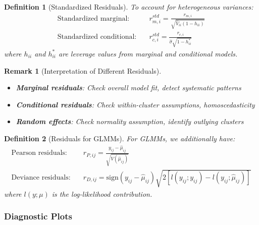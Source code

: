 \documentclass{article}
\newtheorem{definition}{Definition}
\newtheorem{remark}{Remark}
\begin{document}
\begin{definition}[Standardized Residuals]
To account for heterogeneous variances:
\begin{align}
\text{Standardized marginal}: & \quad r_{m,i}^{std} = \frac{r_{m,i}}{\sqrt{\hat{V}_{ii}(1-h_{ii})}} \\
\text{Standardized conditional}: & \quad r_{c,i}^{std} = \frac{r_{c,i}}{\hat{\sigma}\sqrt{1-h_{ii}^*}}
\end{align}
where $h_{ii}$ and $h_{ii}^*$ are leverage values from marginal and conditional models.
\end{definition}

\begin{remark}[Interpretation of Different Residuals]
\begin{itemize}
    \item \textbf{Marginal residuals}: Check overall model fit, detect systematic patterns
    \item \textbf{Conditional residuals}: Check within-cluster assumptions, homoscedasticity
    \item \textbf{Random effects}: Check normality assumption, identify outlying clusters
\end{itemize}
\end{remark}

\begin{definition}[Residuals for GLMMs]
For GLMMs, we additionally have:
\begin{align}
\text{Pearson residuals}: & \quad r_{P,ij} = \frac{y_{ij} - \hat{\mu}_{ij}}{\sqrt{V(\hat{\mu}_{ij})}} \\
\text{Deviance residuals}: & \quad r_{D,ij} = \text{sign}(y_{ij} - \hat{\mu}_{ij})\sqrt{2[l(y_{ij};y_{ij}) - l(y_{ij};\hat{\mu}_{ij})]}
\end{align}
where $l(y;\mu)$ is the log-likelihood contribution.
\end{definition}

\subsubsection{Diagnostic Plots}
\end{document}
